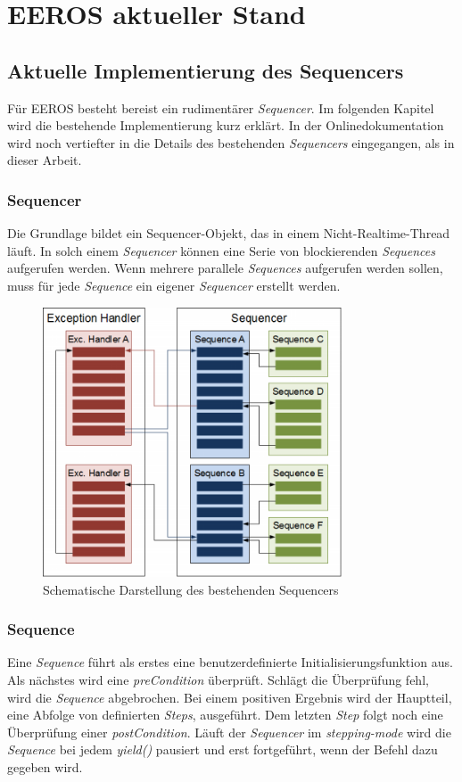 \chapter{EEROS aktueller Stand}

\section{Aktuelle Implementierung des Sequencers}
Für EEROS besteht bereist ein rudimentärer \textit{Sequencer}.
Im folgenden Kapitel wird die bestehende Implementierung kurz erklärt.
In der Onlinedokumentation \cite{eerosOrg} wird noch vertiefter in die Details des bestehenden \textit{Sequencers} eingegangen, als in dieser Arbeit.


\subsection{Sequencer}
Die Grundlage bildet ein Sequencer-Objekt, das in einem Nicht-Realtime-Thread läuft.
In solch einem \textit{Sequencer} können eine Serie von blockierenden \textit{Sequences} aufgerufen werden.
Wenn mehrere parallele \textit{Sequences} aufgerufen werden sollen, muss für jede \textit{Sequence} ein eigener \textit{Sequencer} erstellt werden.

\begin{figure}[!ht]
\centering
\includegraphics[angle=0,height=8cm]{images/SequencerBestehend.png}
\caption{Schematische Darstellung des bestehenden Sequencers \cite{eerosWiki}}
\label{sequencerBestehend}
\end{figure}


\subsection{Sequence}
Eine \textit{Sequence} führt als erstes eine benutzerdefinierte Initialisierungsfunktion aus.
Als nächstes wird eine \textit{preCondition} überprüft.
Schlägt die Überprüfung fehl, wird die \textit{Sequence} abgebrochen.
Bei einem positiven Ergebnis wird der Hauptteil, eine Abfolge von definierten \textit{Steps}, ausgeführt.
Dem letzten \textit{Step} folgt noch eine Überprüfung einer \textit{postCondition}.
Läuft der \textit{Sequencer} im \textit{stepping-mode} wird die \textit{Sequence} bei jedem \textit{yield()} pausiert und erst fortgeführt, wenn der Befehl dazu gegeben wird. \cite{eerosWiki}

